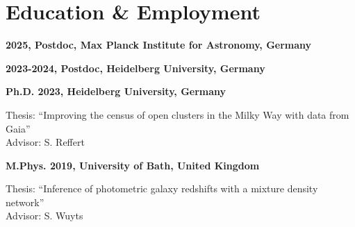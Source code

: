 \section*{Education \& Employment}

\textbf{2025, Postdoc, Max Planck Institute for Astronomy, Germany}
\vspace{0.2cm}

\textbf{2023-2024, Postdoc, Heidelberg University, Germany}
\vspace{0.2cm}

\textbf{Ph.D. 2023, Heidelberg University, Germany}
\begin{addmargin}[2em]{0em}
    Thesis: ``Improving the census of open clusters in the Milky Way with data from Gaia''\\
    Advisor: S. Reffert
\end{addmargin}
\vspace{0.2cm}

\textbf{M.Phys. 2019, University of Bath, United Kingdom}
\begin{addmargin}[2em]{0em}
    Thesis: ``Inference of photometric galaxy redshifts with a mixture density network''\\
    Advisor: S. Wuyts
\end{addmargin}
